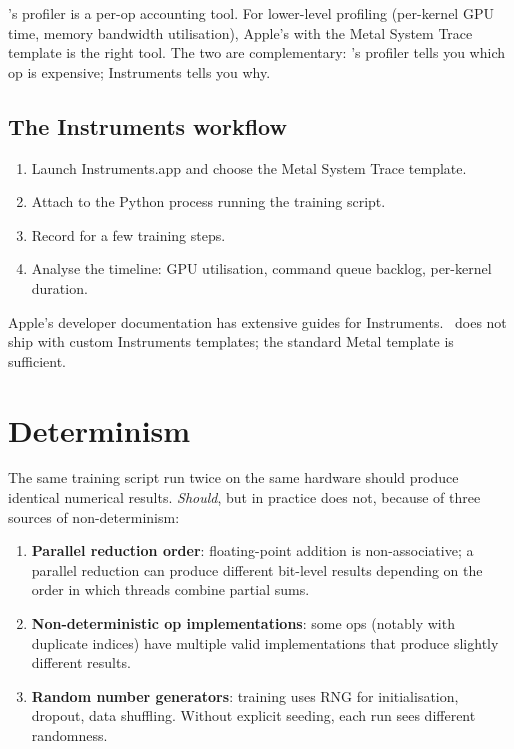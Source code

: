 \Lucid's profiler is a per-op accounting tool. For lower-level
profiling (per-kernel GPU time, memory bandwidth utilisation),
Apple's  with the Metal System Trace
template is the right tool. The two are complementary:
\Lucid's profiler tells you which op is expensive; Instruments
tells you why.

\subsection{The Instruments workflow}
\label{ssec:profiler_determinism:instruments}

\begin{enumerate}
  \item Launch Instruments.app and choose the Metal System Trace
    template.
  \item Attach to the Python process running the training script.
  \item Record for a few training steps.
  \item Analyse the timeline: GPU utilisation, command queue
    backlog, per-kernel duration.
\end{enumerate}

Apple's developer documentation has extensive guides for
Instruments. \Lucid\ does not ship with custom Instruments
templates; the standard Metal template is sufficient.

\section{Determinism}
\label{sec:profiler_determinism:determinism}

The same training script run twice on the same hardware should
produce identical numerical results. \emph{Should}, but in
practice does not, because of three sources of non-determinism:

\begin{enumerate}
  \item \textbf{Parallel reduction order}: floating-point
    addition is non-associative; a parallel reduction can produce
    different bit-level results depending on the order in which
    threads combine partial sums.
  \item \textbf{Non-deterministic op implementations}: some ops
    (notably  with duplicate indices) have
    multiple valid implementations that produce slightly
    different results.
  \item \textbf{Random number generators}: training uses RNG for
    initialisation, dropout, data shuffling. Without explicit
    seeding, each run sees different randomness.
\end{enumerate}

